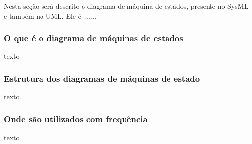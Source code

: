 Nesta seção será descrito o diagrama de máquina de estados, presente no SysML e também no UML. Ele é .......

\subsubsection{O que é o diagrama de máquinas de estados}
texto

\subsubsection{Estrutura dos diagramas de máquinas de estado}
texto

\subsubsection{Onde são utilizados com frequência}
texto